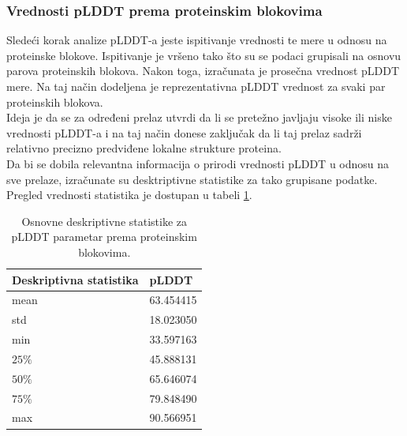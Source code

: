 \documentclass[a4paper,12pt]{article}
\begin{document}
\subsubsection{Vrednosti pLDDT prema proteinskim blokovima}
Sledeći korak analize pLDDT-a jeste ispitivanje vrednosti te mere u odnosu na proteinske blokove. Ispitivanje je vršeno tako što su se podaci grupisali na osnovu parova proteinskih blokova. Nakon toga, izračunata je prosečna vrednost pLDDT mere. Na taj način dodeljena je reprezentativna pLDDT vrednost za svaki par proteinskih blokova. \\
Ideja je da se za određeni prelaz utvrdi da li se pretežno javljaju visoke ili niske vrednosti pLDDT-a i na taj način donese zaključak da li taj prelaz sadrži relativno precizno predviđene lokalne strukture proteina. \\
Da bi se dobila relevantna informacija o prirodi vrednosti pLDDT u odnosu na sve prelaze, izračunate su desktriptivne statistike za tako grupisane podatke. Pregled vrednosti statistika je dostupan u tabeli \ref{Tabela:5}.
\begin{table}[h!]
    \centering
    \begin{tabular}{ |l|l| } 
    \hline
    \textbf{Deskriptivna statistika} & \textbf{pLDDT} \\
    \hline
    mean & 63.454415 \\
    std  & 18.023050 \\
    min  & 33.597163 \\
    $25\%$  & 45.888131 \\
    $50\%$  & 65.646074 	\\
    $75\%$ &  79.848490\\
    max & 90.566951 	\\
    \hline
    \end{tabular}
    \caption{Osnovne deskriptivne statistike za pLDDT parametar prema proteinskim blokovima.}
    \label{Tabela:5}
\end{table}
\end{document}
